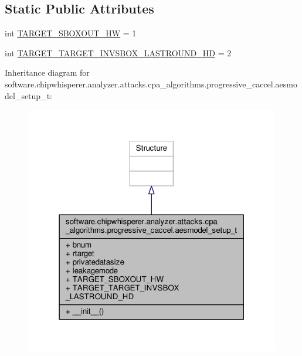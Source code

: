 \subsection*{Static Public Attributes}
\begin{DoxyCompactItemize}
\item 
int \hyperlink{classsoftware_1_1chipwhisperer_1_1analyzer_1_1attacks_1_1cpa__algorithms_1_1progressive__caccel_1_1aesmodel__setup__t_a2cb30ae13a6df947ec2db1fd6adee826}{T\+A\+R\+G\+E\+T\+\_\+\+S\+B\+O\+X\+O\+U\+T\+\_\+\+H\+W} = 1
\item 
int \hyperlink{classsoftware_1_1chipwhisperer_1_1analyzer_1_1attacks_1_1cpa__algorithms_1_1progressive__caccel_1_1aesmodel__setup__t_a2f6bc767502b33f7e4d8024ee87502c1}{T\+A\+R\+G\+E\+T\+\_\+\+T\+A\+R\+G\+E\+T\+\_\+\+I\+N\+V\+S\+B\+O\+X\+\_\+\+L\+A\+S\+T\+R\+O\+U\+N\+D\+\_\+\+H\+D} = 2
\end{DoxyCompactItemize}


Inheritance diagram for software.\+chipwhisperer.\+analyzer.\+attacks.\+cpa\+\_\+algorithms.\+progressive\+\_\+caccel.\+aesmodel\+\_\+setup\+\_\+t\+:\nopagebreak
\begin{figure}[H]
\begin{center}
\leavevmode
\includegraphics[width=316pt]{d1/dda/classsoftware_1_1chipwhisperer_1_1analyzer_1_1attacks_1_1cpa__algorithms_1_1progressive__caccel_16db9afd59cb343fb36b3294802bc424}
\end{center}
\end{figure}


